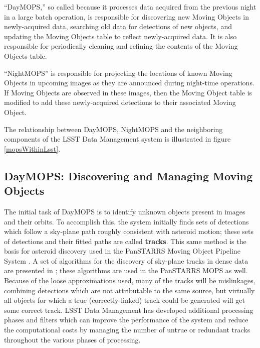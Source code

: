 \documentclass[12pt,preprint]{aastex}
\begin{document}
``DayMOPS,'' so called because it processes data acquired from the
previous night in a large batch operation, is responsible for
discovering new Moving Objects in newly-acquired data, searching old
data for detections of new objects, and updating the Moving Objects
table to reflect newly-acquired data. It is also responsible for
periodically cleaning and refining the contents of the Moving Objects
table.

``NightMOPS'' is responsible for projecting the locations of known
Moving Objects in upcoming images as they are announced during
night-time operations.  If Moving Objects are observed in these
images, then the Moving Object table is modified to add these
newly-acquired detections to their associated Moving Object.

The relationship between DayMOPS, NightMOPS and the neighboring
components of the LSST Data Management system is illustrated in
figure \ref{mopsWithinLsst}.

\subsection{DayMOPS: Discovering and Managing Moving Objects}



The initial task of DayMOPS is to identify unknown objects present in
images and their orbits.  To accomplish this, the system initially
finds sets of detections which follow a sky-plane path roughly
consistent with asteroid motion; these sets of detections and their
fitted paths are called \textbf{tracks}.  This same method is the
basis for asteroid discovery used in the PanSTARRS Moving Object
Pipeline System \citep{psMOPSDesign}.  A set of algorithms for the
discovery of sky-plane tracks in dense data are presented in
\citet{Kubica:2005:MTA:1081870.1081889}; these algorithms are used in
the PanSTARRS MOPS as well.  Because of the loose approximations used,
many of the tracks will be mislinkages, combining detections which are
not attributable to the same source, but virtually all objects for
which a true (correctly-linked) track could be generated will get some
correct track.  LSST Data Management has developed additional
processing phases and filters which can improve the performance of the
system and reduce the computational costs by managing the number of
untrue or redundant tracks throughout the various phases of
processing.
\end{document}

